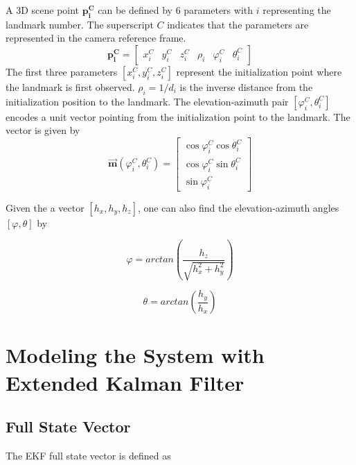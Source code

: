 \noindent A 3D scene point $\boldsymbol{p_{i}^{C}}$ can be defined by 6 parameters
with $i$ representing the landmark number. The superscript $C$
indicates that the parameters are represented in the camera reference frame.
\begin{equation}
\boldsymbol{p_{i}^{C}}=\begin{bmatrix}
x_{i}^{C} & y_{i}^{C} & z_{i}^{C} & \rho _{i} & \varphi _{i}^{C} & 
\theta _{i}^{C} 
\end{bmatrix}
\end{equation}
The first three parameters $[x_{i}^{C}, y_{i}^{C}, z_{i}^{C}]$
represent the initialization point where the landmark is first observed.
$\rho_{i} = 1/d_i$ is the inverse distance from the initialization position
to the landmark. The elevation-azimuth pair $[\varphi_{i}^{C},
\theta_{i}^{C}]$ encodes a unit vector pointing from the
initialization point to the landmark. The vector is given by
\begin{equation}
\label{eq:m}
\vec{\boldsymbol{m}}(\varphi_{i}^{C}, \theta_{i}^{C})=\begin{bmatrix}
\cos\varphi_{i}^{C}\cos\theta _{i}^{C} \\
\cos\varphi_{i}^{C}\sin\theta _{i}^{C} \\
\sin\varphi_{i}^{C}
\end{bmatrix}
\end{equation}

\noindent Given the a vector $[h_x, h_y, h_z]$, one can also find the
elevation-azimuth angles $[\varphi, \theta]$ by

\begin{equation}
\label{eq:m_inv_varphi}
\varphi 
=arctan\left(\frac{h_{z}}{\sqrt{h_x^2+h_y^2}}\right)
\end{equation}

\begin{equation}
\label{eq:m_inv_theta}
\theta =arctan\left(\frac{h_{y}}{h_{x}}\right)
\end{equation}


\section{Modeling the System with Extended Kalman 
Filter}

\subsection{Full State Vector}

The EKF full state vector is defined as 

